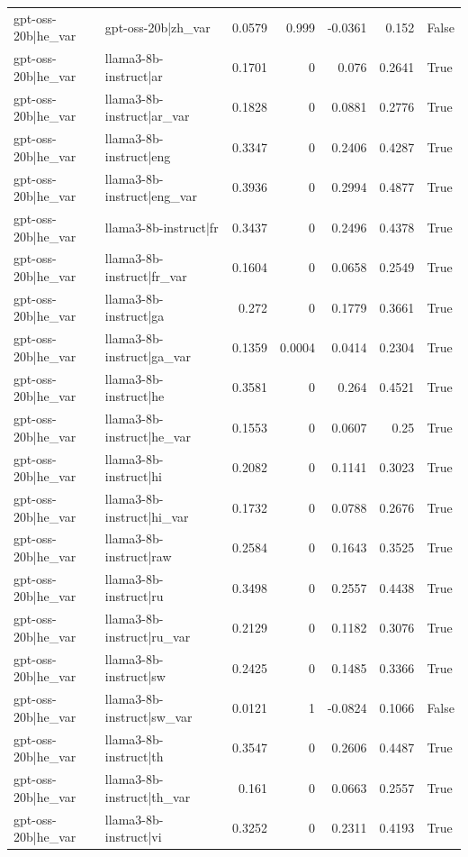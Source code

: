 \begin{table}
\begin{tabular}{l l r r r r l}
gpt-oss-20b|he_var & gpt-oss-20b|zh_var & 0.0579 & 0.999 & -0.0361 & 0.152 & False \\
gpt-oss-20b|he_var & llama3-8b-instruct|ar & 0.1701 & 0 & 0.076 & 0.2641 & True \\
gpt-oss-20b|he_var & llama3-8b-instruct|ar_var & 0.1828 & 0 & 0.0881 & 0.2776 & True \\
gpt-oss-20b|he_var & llama3-8b-instruct|eng & 0.3347 & 0 & 0.2406 & 0.4287 & True \\
gpt-oss-20b|he_var & llama3-8b-instruct|eng_var & 0.3936 & 0 & 0.2994 & 0.4877 & True \\
gpt-oss-20b|he_var & llama3-8b-instruct|fr & 0.3437 & 0 & 0.2496 & 0.4378 & True \\
gpt-oss-20b|he_var & llama3-8b-instruct|fr_var & 0.1604 & 0 & 0.0658 & 0.2549 & True \\
gpt-oss-20b|he_var & llama3-8b-instruct|ga & 0.272 & 0 & 0.1779 & 0.3661 & True \\
gpt-oss-20b|he_var & llama3-8b-instruct|ga_var & 0.1359 & 0.0004 & 0.0414 & 0.2304 & True \\
gpt-oss-20b|he_var & llama3-8b-instruct|he & 0.3581 & 0 & 0.264 & 0.4521 & True \\
gpt-oss-20b|he_var & llama3-8b-instruct|he_var & 0.1553 & 0 & 0.0607 & 0.25 & True \\
gpt-oss-20b|he_var & llama3-8b-instruct|hi & 0.2082 & 0 & 0.1141 & 0.3023 & True \\
gpt-oss-20b|he_var & llama3-8b-instruct|hi_var & 0.1732 & 0 & 0.0788 & 0.2676 & True \\
gpt-oss-20b|he_var & llama3-8b-instruct|raw & 0.2584 & 0 & 0.1643 & 0.3525 & True \\
gpt-oss-20b|he_var & llama3-8b-instruct|ru & 0.3498 & 0 & 0.2557 & 0.4438 & True \\
gpt-oss-20b|he_var & llama3-8b-instruct|ru_var & 0.2129 & 0 & 0.1182 & 0.3076 & True \\
gpt-oss-20b|he_var & llama3-8b-instruct|sw & 0.2425 & 0 & 0.1485 & 0.3366 & True \\
gpt-oss-20b|he_var & llama3-8b-instruct|sw_var & 0.0121 & 1 & -0.0824 & 0.1066 & False \\
gpt-oss-20b|he_var & llama3-8b-instruct|th & 0.3547 & 0 & 0.2606 & 0.4487 & True \\
gpt-oss-20b|he_var & llama3-8b-instruct|th_var & 0.161 & 0 & 0.0663 & 0.2557 & True \\
gpt-oss-20b|he_var & llama3-8b-instruct|vi & 0.3252 & 0 & 0.2311 & 0.4193 & True \\

\end{tabular}
\end{table}
